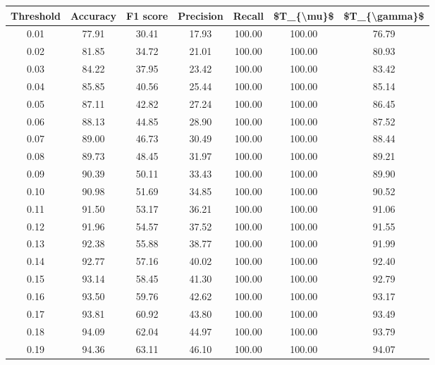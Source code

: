 \begin{tabular}{|c|c|c|c|c|c|c|}
\hline
 Threshold &  Accuracy &  F1 score &  Precision &  Recall &  \$T\_\{\textbackslash mu\}\$ &  \$T\_\{\textbackslash gamma\}\$ \\
\hline
      0.01 &     77.91 &     30.41 &      17.93 &  100.00 &     100.00 &         76.79 \\
      0.02 &     81.85 &     34.72 &      21.01 &  100.00 &     100.00 &         80.93 \\
      0.03 &     84.22 &     37.95 &      23.42 &  100.00 &     100.00 &         83.42 \\
      0.04 &     85.85 &     40.56 &      25.44 &  100.00 &     100.00 &         85.14 \\
      0.05 &     87.11 &     42.82 &      27.24 &  100.00 &     100.00 &         86.45 \\
      0.06 &     88.13 &     44.85 &      28.90 &  100.00 &     100.00 &         87.52 \\
      0.07 &     89.00 &     46.73 &      30.49 &  100.00 &     100.00 &         88.44 \\
      0.08 &     89.73 &     48.45 &      31.97 &  100.00 &     100.00 &         89.21 \\
      0.09 &     90.39 &     50.11 &      33.43 &  100.00 &     100.00 &         89.90 \\
      0.10 &     90.98 &     51.69 &      34.85 &  100.00 &     100.00 &         90.52 \\
      0.11 &     91.50 &     53.17 &      36.21 &  100.00 &     100.00 &         91.06 \\
      0.12 &     91.96 &     54.57 &      37.52 &  100.00 &     100.00 &         91.55 \\
      0.13 &     92.38 &     55.88 &      38.77 &  100.00 &     100.00 &         91.99 \\
      0.14 &     92.77 &     57.16 &      40.02 &  100.00 &     100.00 &         92.40 \\
      0.15 &     93.14 &     58.45 &      41.30 &  100.00 &     100.00 &         92.79 \\
      0.16 &     93.50 &     59.76 &      42.62 &  100.00 &     100.00 &         93.17 \\
      0.17 &     93.81 &     60.92 &      43.80 &  100.00 &     100.00 &         93.49 \\
      0.18 &     94.09 &     62.04 &      44.97 &  100.00 &     100.00 &         93.79 \\
      0.19 &     94.36 &     63.11 &      46.10 &  100.00 &     100.00 &         94.07 \\

\end{tabular}
